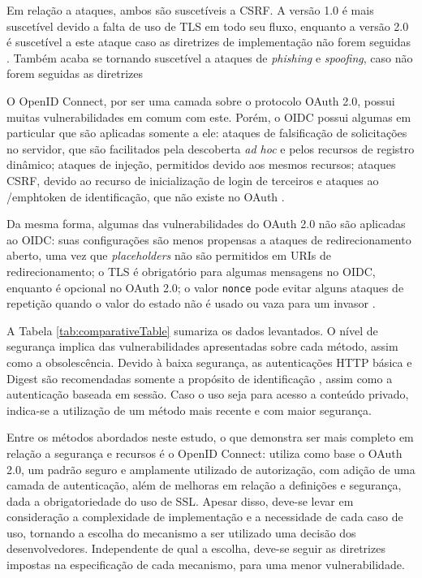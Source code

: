 Em relação a ataques, ambos são suscetíveis a CSRF. A versão 1.0 é mais suscetível devido a 
falta de uso de TLS em todo seu fluxo, enquanto a versão 2.0 é suscetível a este ataque caso as 
diretrizes de implementação não forem seguidas \cite{FETT2016}. Também acaba se tornando suscetível 
a ataques de \emph{phishing} e \emph{spoofing}, caso não forem seguidas as diretrizes \cite{RFC6819}


O OpenID Connect, por ser uma camada sobre o protocolo OAuth 2.0, possui muitas vulnerabilidades 
em comum com este. Porém, o OIDC possui algumas em particular que são aplicadas somente a
ele: ataques de falsificação de solicitações no servidor, que são facilitados pela descoberta 
\emph{ad hoc} e pelos recursos de registro dinâmico; ataques de injeção, permitidos devido aos mesmos
recursos; ataques CSRF, devido ao recurso de inicialização de login de terceiros e ataques ao
/emph{token} de identificação, que não existe no OAuth \cite{FETT2017}.

Da mesma forma, algumas das vulnerabilidades do OAuth 2.0 não são aplicadas ao OIDC: 
suas configurações são menos propensas a ataques de redirecionamento aberto, uma vez que 
\emph{placeholders} não são permitidos em URIs de redirecionamento; o TLS é obrigatório para 
algumas mensagens no OIDC, enquanto é opcional no OAuth 2.0; o valor \texttt{nonce} pode evitar 
alguns ataques de repetição quando o valor do estado não é usado ou vaza para um invasor 
\cite{FETT2017}.



A Tabela \ref{tab:comparativeTable} sumariza os dados levantados. O nível de segurança implica das
vulnerabilidades apresentadas sobre cada método, assim como a obsolescência. Devido à baixa 
segurança, as autenticações HTTP básica e Digest são recomendadas somente a propósito de
identificação \cite{RFC2617}, assim como a autenticação baseada em sessão. Caso o uso seja para 
acesso a conteúdo privado, indica-se a utilização de um método mais recente e com maior segurança. 

Entre os métodos abordados neste estudo, o que demonstra ser mais completo em relação a segurança e 
recursos é o OpenID Connect: utiliza como base o OAuth 2.0, um padrão seguro e amplamente utilizado 
de autorização, com adição de uma camada de autenticação, além de melhoras em relação a definições 
e segurança, dada a obrigatoriedade do uso de SSL. Apesar disso, deve-se levar em consideração a 
complexidade de implementação e a necessidade de cada caso de uso, tornando a escolha do mecanismo
a ser utilizado uma decisão dos desenvolvedores. Independente de qual a escolha, deve-se seguir as
diretrizes impostas na especificação de cada mecanismo, para uma menor vulnerabilidade.